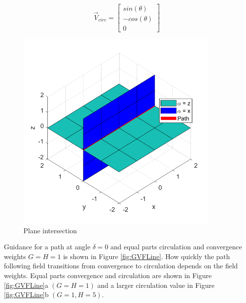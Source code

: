 \documentclass[conf]{new-aiaa}
\begin{document}
\begin{equation}
\label{eq:circStraightPart2}
\overrightarrow{V}_{circ} = \begin{bmatrix}
sin(\theta) \\
-cos(\theta) \\
0
\end{bmatrix}
\end{equation}

\begin{figure}[H]
	\centering
	\includegraphics[trim=0 20 0 20,clip,width=10cm]{Figures/planeIntersection}
	\caption{Plane intersection}
	\label{fig:planeIntersection}
\end{figure}

Guidance for a path at angle $\delta = 0$ and equal parts circulation and convergence weights $G=H=1$ is shown in Figure \ref{fig:GVFLine}. How quickly the path following field transitions from convergence to circulation depends on the field weights. Equal parts convergence and circulation are shown in Figure \ref{fig:GVFLine}a $(G=H=1)$ and a larger circulation value in Figure \ref{fig:GVFLine}b $(G=1, H=5)$.
\end{document}
